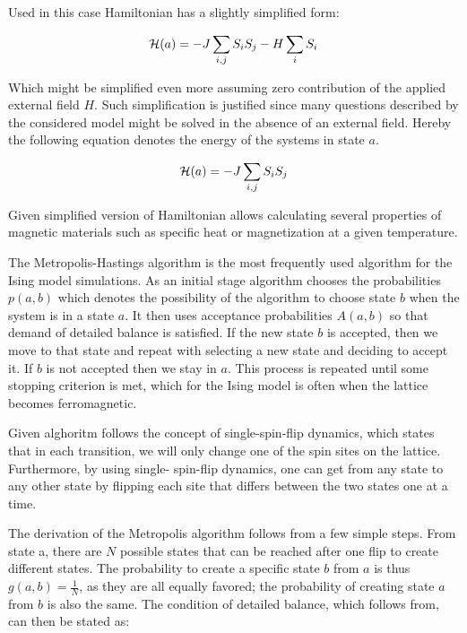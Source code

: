 Used in this case Hamiltonian has a slightly simplified form: 

\begin{equation}
{\cal H} (a) = -J \sum \limits_{i, j}  S_i S_j - H \sum \limits_{i} S_i
\end{equation}

Which might be simplified even more assuming zero contribution of the applied external field $H$. Such simplification is justified since many questions described by the considered model might be solved in the absence of an external field.  Hereby the following equation denotes the energy of the systems in state $a$.

\begin{equation}
{\cal H} (a) = -J \sum \limits_{i, j}  S_i S_j
\end{equation}

Given simplified version of Hamiltonian allows calculating several properties of magnetic materials such as specific heat or magnetization at a given temperature.

The Metropolis-Hastings algorithm is the most frequently used algorithm for the Ising model simulations.  As an initial stage algorithm chooses the probabilities $p(a,  b)$ which denotes the possibility of the algorithm to choose state $b$ when the system is in a state $a$.
It then uses acceptance probabilities $A(a, b)$ so that demand of detailed balance is satisfied.  If the new state $b$ is accepted, then we move to that state and repeat with selecting a new state and deciding to accept it. If $b$ is not accepted then we stay in $a$. This process is repeated until some stopping criterion is met, which for the Ising model is often when the lattice becomes ferromagnetic. 

Given alghoritm follows the concept of single-spin-flip dynamics, which states that in each transition, we will only change one of the spin sites on the lattice. Furthermore, by using single- spin-flip dynamics, one can get from any state to any other state by flipping each site that differs between the two states one at a time.

The derivation of the Metropolis algorithm follows from a few simple steps. From state a, there are $N$ possible states that can be reached after one flip to create different states. The probability to create a specific state $b$ from $a$ is thus $g(a, b) = \frac{1}{N}$, as they
are all equally favored; the probability of creating state $a$ from $b$ is also the same. The condition of detailed balance, which follows from,  can then be stated as:

